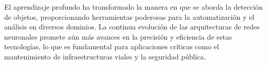El aprendizaje profundo ha transformado la manera en que se aborda la detección de objetos, proporcionando herramientas poderosas para la automatización y el análisis en diversos dominios. La continua evolución de las arquitecturas de redes neuronales promete aún más avances en la precisión y eficiencia de estas tecnologías, lo que es fundamental para aplicaciones críticas como el mantenimiento de infraestructuras viales y la seguridad pública.

